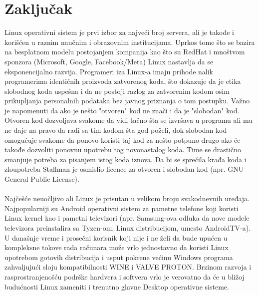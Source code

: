 \documentclass[a4paper,14pt]{article}
\begin{document}
\section{Zaključak}
Linux operativni sistem je prvi izbor za najveći broj servera, ali je takođe i korišćen u raznim naučnim i obrazovnim institucijama. Uprkos tome što se bazira na besplatnom modelu postojanjem kompanija kao što su RedHat i mnoštvom sponzora (Microsoft, Google, Facebook/Meta) Linux nastavlja da se eksponencijalno razvija. Programeri iza Linux-a imaju prihode nalik programerima identičnih proizvoda zatvorenog koda, što dokazuje da je etika slobodnog koda uspešna i da ne postoji razlog za zatvorenim kodom osim prikupljanja personalnih podataka bez javnog priznanja o tom postupku. Važno je napomenuti da ako je nešto "otvoren" kod ne znači i da je "slobodan" kod. Otvoren kod dozvoljava svakome da vidi tačno šta se izvršava u programu ali mu ne daje na pravo da radi sa tim kodom šta god poželi, dok slobodan kod omogućuje svakome da ponovo koristi taj kod za nešto potpuno drugo ako će takođe dozvoliti ponovnu upotrebu tog novonastalog koda. Time se drastično smanjuje potreba za pisanjem istog koda iznova. Da bi se sprečila krađa koda i zloupotreba Stallman je osmislio licence za otvoren i slobodan kod (npr. GNU General Public License\cite{gpl}).
\\\\
Najčešće neuočljivo ali Linux je prisutan u velikom broju svakodnevnih uređaja. Najpopularniji su Android operativni sistem za pametne telefone koji koristi Linux kernel kao i pametni televizori (npr. Samsung-ova odluka da nove modele televizora preinstalira sa Tyzen-om, Linux distribucijom, umesto AndroidTV-a). U današnje vreme i prosečni korisnik koji nije i ne želi da bude upućen u kompleksne tokove rada računara može vrlo jednostavno da koristi Linux upotrebom gotovih distribucija i usput pokrene većinu Windows programa zahvaljujući sloju kompatibilnosti WINE\cite{wine} i VALVE\cite{valve} PROTON\cite{proton}. Brzinom razvoja i rasprostranjenošću podrške hardvera i softvera vrlo je verovatno da će u bližoj budućnosti Linux zameniti i trenutno glavne Desktop operativne sisteme.
\newpage

\renewcommand\refname{Literatura}


\newpage
\end{document}
